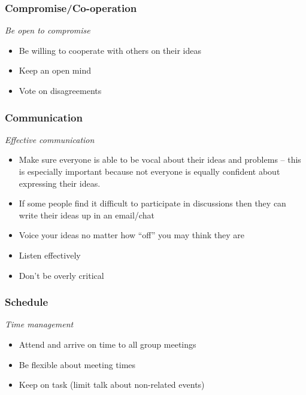 \documentclass[
]{gitbook}
\providecommand{\tightlist}{%
  \setlength{\itemsep}{0pt}\setlength{\parskip}{0pt}}
\begin{document}
\hypertarget{compromiseco-operation}{%
\subsubsection{Compromise/Co-operation}\label{compromiseco-operation}}

\emph{Be open to compromise}

\begin{itemize}
\tightlist
\item
  Be willing to cooperate with others on their ideas
\item
  Keep an open mind
\item
  Vote on disagreements
\end{itemize}

\hypertarget{communication}{%
\subsubsection{Communication}\label{communication}}

\emph{Effective communication}

\begin{itemize}
\tightlist
\item
  Make sure everyone is able to be vocal about their ideas and problems -- this is especially important because not everyone is equally confident about expressing their ideas.
\item
  If some people find it difficult to participate in discussions then they can write their ideas up in an email/chat
\item
  Voice your ideas no matter how ``off'' you may think they are
\item
  Listen effectively
\item
  Don't be overly critical
\end{itemize}

\hypertarget{schedule}{%
\subsubsection{Schedule}\label{schedule}}

\emph{Time management}

\begin{itemize}
\tightlist
\item
  Attend and arrive on time to all group meetings
\item
  Be flexible about meeting times
\item
  Keep on task (limit talk about non-related events)
\end{itemize}
\end{document}
